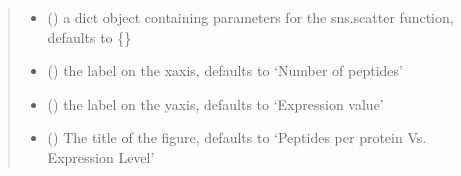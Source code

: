 \documentclass[letterpaper,10pt,english]{sphinxmanual}
\begin{document}
\begin{fulllineitems}
\begin{quote}
\begin{description}
\begin{itemize}
\item {} 
 (\sphinxstyleliteralemphasis{\sphinxupquote{{[}}}\sphinxstyleliteralemphasis{\sphinxupquote{,}}\sphinxstyleliteralemphasis{\sphinxupquote{{]}}}\sphinxstyleliteralemphasis{\sphinxupquote{, }}) \textendash{} a dict object containing parameters for the sns.scatter function, defaults to \{\}

\item {} 
 (\sphinxstyleliteralemphasis{\sphinxupquote{, }}) \textendash{} the label on the x\sphinxhyphen{}axis, defaults to ‘Number of peptides’

\item {} 
 (\sphinxstyleliteralemphasis{\sphinxupquote{, }}) \textendash{} the label on the y\sphinxhyphen{}axis, defaults to ‘Expression value’

\item {} 
 (\sphinxstyleliteralemphasis{\sphinxupquote{, }}) \textendash{} The title of the figure, defaults to ‘Peptides per protein Vs. Expression Level’

\end{itemize}

\end{description}\end{quote}

\end{fulllineitems}

\end{document}

